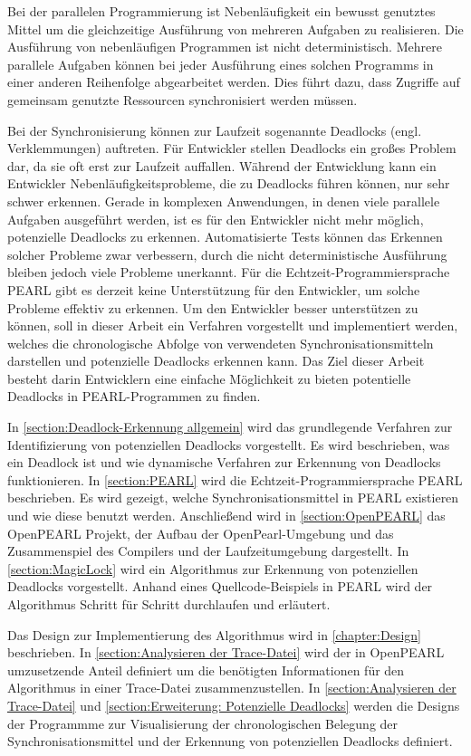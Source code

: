 Bei der parallelen Programmierung ist Nebenläufigkeit ein bewusst genutztes
Mittel um die gleichzeitige Ausführung von mehreren Aufgaben zu realisieren. Die
Ausführung von nebenläufigen Programmen ist nicht deterministisch. Mehrere
parallele Aufgaben können bei jeder Ausführung eines solchen Programms in einer
anderen Reihenfolge abgearbeitet werden. Dies führt dazu, dass Zugriffe auf
gemeinsam genutzte Ressourcen synchronisiert werden müssen.

Bei der Synchronisierung können zur Laufzeit sogenannte Deadlocks (engl.
Verklemmungen) auftreten. Für Entwickler stellen Deadlocks ein großes Problem
dar, da sie oft erst zur Laufzeit auffallen. Während der Entwicklung kann ein
Entwickler Nebenläufigkeitsprobleme, die zu Deadlocks führen können, nur sehr
schwer erkennen. Gerade in komplexen Anwendungen, in denen viele parallele
Aufgaben ausgeführt werden, ist es für den Entwickler nicht mehr möglich,
potenzielle Deadlocks zu erkennen. Automatisierte Tests können das Erkennen
solcher Probleme zwar verbessern, durch die nicht deterministische Ausführung
bleiben jedoch viele Probleme unerkannt. Für die Echtzeit-Programmiersprache
PEARL gibt es derzeit keine Unterstützung für den Entwickler, um solche Probleme
effektiv zu erkennen. Um den Entwickler besser unterstützen zu können, soll in
dieser Arbeit ein Verfahren vorgestellt und implementiert werden, welches die
chronologische Abfolge von verwendeten Synchronisationsmitteln darstellen und
potenzielle Deadlocks erkennen kann. Das Ziel dieser Arbeit besteht darin
Entwicklern eine einfache Möglichkeit zu bieten potentielle Deadlocks in
PEARL-Programmen zu finden.

In \cref{section:Deadlock-Erkennung allgemein} wird das grundlegende Verfahren
zur Identifizierung von potenziellen Deadlocks vorgestellt. Es wird beschrieben,
was ein Deadlock ist und wie dynamische Verfahren zur Erkennung von Deadlocks
funktionieren. In \cref{section:PEARL} wird die Echtzeit-Programmiersprache
PEARL beschrieben. Es wird gezeigt, welche Synchronisationsmittel in PEARL
existieren und wie diese benutzt werden. Anschließend wird in
\cref{section:OpenPEARL} das OpenPEARL Projekt, der Aufbau der
OpenPearl-Umgebung und das Zusammenspiel des Compilers und der Laufzeitumgebung
dargestellt. In \cref{section:MagicLock} wird ein Algorithmus zur Erkennung von
potenziellen Deadlocks vorgestellt. Anhand eines Quellcode-Beispiels in PEARL
wird der Algorithmus Schritt für Schritt durchlaufen und erläutert. 

Das Design zur Implementierung des Algorithmus wird in \cref{chapter:Design}
beschrieben. In \cref{section:Analysieren der Trace-Datei} wird der in OpenPEARL
umzusetzende Anteil definiert um die benötigten Informationen für den
Algorithmus in einer Trace-Datei zusammenzustellen. In \cref{section:Analysieren
der Trace-Datei} und \cref{section:Erweiterung: Potenzielle Deadlocks} werden
die Designs der Programmme zur Visualisierung der chronologischen Belegung der
Synchronisationsmittel und der Erkennung von potenziellen Deadlocks definiert.

